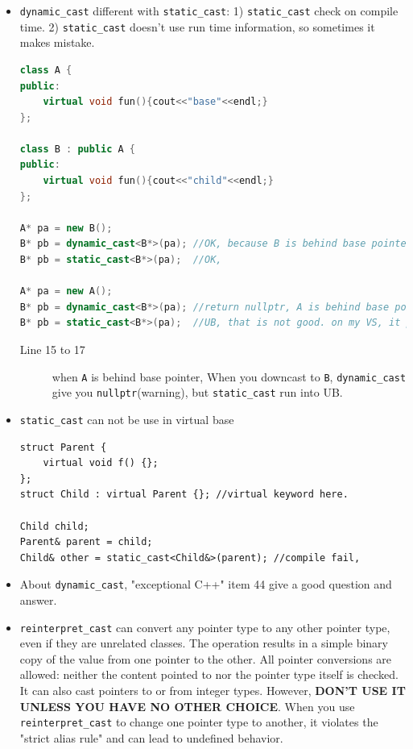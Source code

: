 \documentclass[a4paper,11pt,twoside]{book}
\begin{document}
\begin{itemize}
	\item \texttt{dynamic\_cast} different with \texttt{static\_cast}: 1) \texttt{static\_cast} check on compile time. 2) \texttt{static\_cast} doesn't use run time information, so sometimes it makes mistake.
\begin{lstlisting}[frame=single, language=c++, mathescape=true]
class A {
public:
	virtual void fun(){cout<<"base"<<endl;}
};

class B : public A {
public:
	virtual void fun(){cout<<"child"<<endl;}
};

A* pa = new B();
B* pb = dynamic_cast<B*>(pa); //OK, because B is behind base pointer pa,
B* pb = static_cast<B*>(pa);  //OK, 	

A* pa = new A();
B* pb = dynamic_cast<B*>(pa); //return nullptr, A is behind base pointer pa, 
B* pb = static_cast<B*>(pa);  //UB, that is not good. on my VS, it print "base"
\end{lstlisting}
\begin{description}
	\item[Line 15 to 17]  when \texttt{A} is behind base pointer, When you downcast to \texttt{B}, \texttt{dynamic\_cast} give you \texttt{nullptr}(warning), but \texttt{static\_cast} run into UB.	
\end{description}

	\item \texttt{static\_cast} can not be use in virtual base 
\begin{lstlisting}[numbers = none]
struct Parent {
	virtual void f() {};
};
struct Child : virtual Parent {}; //virtual keyword here.

Child child;
Parent& parent = child;
Child& other = static_cast<Child&>(parent); //compile fail, 
\end{lstlisting}

	\item About \texttt{dynamic\_cast}, "exceptional C++" item 44 give a good question and answer.
	
	\item \texttt{reinterpret\_cast} can convert any pointer type to any other pointer type, even if they are unrelated classes. The operation results in a simple binary copy of the value from one pointer to the other. All pointer conversions are allowed: neither the content pointed to nor the pointer type itself is checked. It can also cast pointers to or from integer types. However, \textbf{DON'T USE IT UNLESS YOU HAVE NO OTHER CHOICE}. When you use \texttt{reinterpret\_cast} to change one pointer type to another, it violates the "strict alias rule" and can lead to undefined behavior.
	

\end{itemize}
\end{document}
